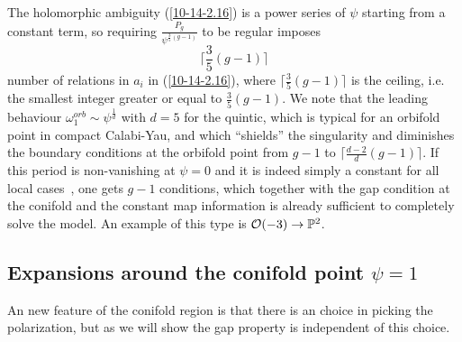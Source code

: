 \documentclass[12pt]{article}
\begin{document}
The holomorphic ambiguity (\ref{10-14-2.16}) is a power series
of $\psi$ starting from a constant term, so requiring
$\frac{P_g}{\psi^{\frac{3}{5}(g-1)}}$ to be regular imposes
\begin{equation}
\lceil\frac{3}{5}(g-1)\rceil
\end{equation}
number of relations in $a_i$ in (\ref{10-14-2.16}), where
$\lceil\frac{3}{5}(g-1)\rceil$ is the ceiling, i.e. the smallest
integer greater or equal to $\frac{3}{5}(g-1)$. We note that the
leading behaviour $\omega^{orb}_1\sim \psi^\frac{1}{d}$ with $d=5$
for the quintic, which is typical for an orbifold point in compact
Calabi-Yau, and which ``shields'' the singularity and diminishes
the boundary conditions at the orbifold point from $g-1$ to
$\lceil \frac{d-2}{d}(g-1)\rceil $. If this period is
non-vanishing at $\psi=0$ and it is indeed simply a constant for
all local cases~\cite{Huang2}, one gets $g-1$ conditions, which
together with the gap condition at the conifold and the constant
map information is already sufficient to completely solve the
model. An example of this type is ${\cal O}(-3)\rightarrow
\mathbb{P}^2$.

\subsection{Expansions around the conifold point $\psi=1$}
\label{quinticconifold}
An new feature of the conifold region is that there is an 
choice in picking the polarization, but as we will show 
the gap property is independent of this choice.       
\end{document}
